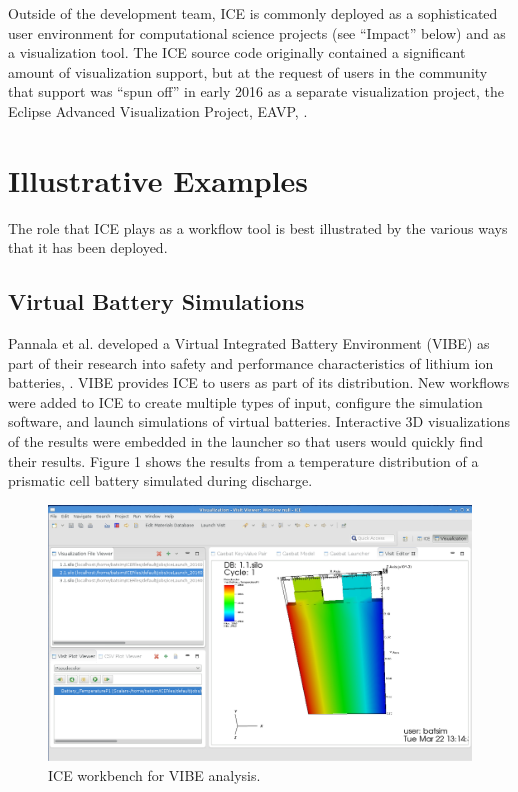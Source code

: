 Outside of the development team, ICE is commonly deployed as a
sophisticated user environment for computational science projects (see
``Impact'' below) and as a visualization tool. The ICE source code originally contained a
significant amount of visualization support, but at the request of users
in the community that support was ``spun off'' in early 2016 as a
separate visualization project, the Eclipse Advanced Visualization
Project, EAVP, \cite{billings_eclipse_2015}.

\section{Illustrative Examples}\label{illustrative-examples}

The role that ICE plays as a workflow tool is best illustrated by the
various ways that it has been deployed.

\subsection{Virtual Battery
Simulations}\label{virtual-battery-simulations}

Pannala et al. developed a Virtual Integrated Battery Environment (VIBE)
as part of their research into safety and performance characteristics of
lithium ion batteries, \cite{pannala_multiscale_2015}. VIBE provides ICE to
users as part of its distribution. New workflows were added to ICE to create
multiple types of input, configure the simulation software, and launch
simulations of virtual batteries. Interactive 3D visualizations of the
results were embedded in the launcher so that users would quickly find
their results. Figure 1 shows the results from a temperature
distribution of a prismatic cell battery simulated during discharge.

\begin{figure}[htbp]
\centering
\includegraphics[width=\textwidth]{images/vibe_20151016.png}
\caption{ICE workbench for VIBE analysis.}
\end{figure}

